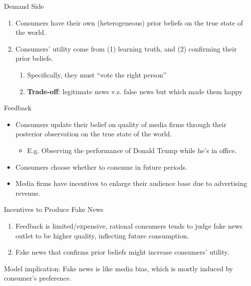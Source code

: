 \documentclass[
  10pt,
  ignorenonframetext,
  aspectratio=43,
]{beamer}
\providecommand{\tightlist}{%
  \setlength{\itemsep}{0pt}\setlength{\parskip}{0pt}}
\begin{document}
\begin{frame}{Demand Side}
\protect\hypertarget{demand-side}{}
\begin{enumerate}
\tightlist
\item
  Consumers have their own (heterogeneous) prior beliefs on the true
  state of the world.
\item
  Consumers' utility come from (1) learning truth, and (2) confirming
  their prior beliefs.

  \begin{enumerate}
  \tightlist
  \item
    Specifically, they must ``vote the right person''
  \item
    \textbf{Trade-off}: legitimate news v.s. false news but which made
    them happy
  \end{enumerate}
\end{enumerate}
\end{frame}

\begin{frame}{Feedback}
\protect\hypertarget{feedback}{}
\begin{itemize}
\tightlist
\item
  Consumers update their belief on quality of media firms through their
  posterior observation on the true state of the world.

  \begin{itemize}
  \tightlist
  \item
    E.g. Observing the performance of Donald Trump while he's in office.
  \end{itemize}
\item
  Consumers choose whether to consume in future periods.
\item
  Media firms have incentives to enlarge their audience base due to
  advertising revenue.
\end{itemize}
\end{frame}

\begin{frame}{Incentives to Produce Fake News}
\protect\hypertarget{incentives-to-produce-fake-news}{}
\begin{enumerate}
\tightlist
\item
  Feedback is limited/expensive, rational consumers tends to judge fake
  news outlet to be higher quality, inflecting future consumption.
\item
  Fake news that confirms prior beliefs might increase consumers'
  utility.
\end{enumerate}

Model implication: Fake news is like media bias, which is mostly induced
by consumer's preference.
\end{frame}
\end{document}

